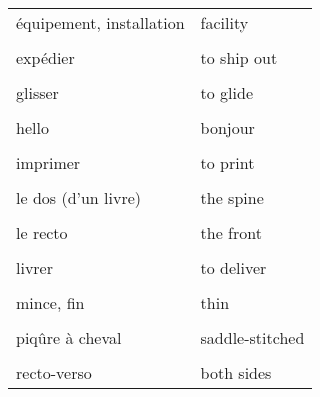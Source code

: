 \documentclass[
  10pt,
]{article}
\begin{document}
\begin{longtable}{ll}
équipement, installation & facility\\

\cellcolor{gray!6}{étape} & \cellcolor{gray!6}{a stage}\\

expédier & to ship out\\

\cellcolor{gray!6}{fonctionner} & \cellcolor{gray!6}{to work}\\

glisser & to glide\\

\cellcolor{gray!6}{gravé au laser} & \cellcolor{gray!6}{laser-etched}\\

hello & bonjour\\

\cellcolor{gray!6}{humecter, humidifier} & \cellcolor{gray!6}{to dampen}\\

imprimer & to print\\

\cellcolor{gray!6}{item fonctionner} & \cellcolor{gray!6}{to work}\\

le dos (d'un livre) & the spine\\

\cellcolor{gray!6}{le grammage} & \cellcolor{gray!6}{paper weight}\\

le recto & the front\\

\cellcolor{gray!6}{le verso} & \cellcolor{gray!6}{the back}\\

livrer & to deliver\\

\cellcolor{gray!6}{mieux convenir à} & \cellcolor{gray!6}{to be best suited for}\\

mince, fin & thin\\

\cellcolor{gray!6}{pailleté, miroitant} & \cellcolor{gray!6}{shimmery}\\

piqûre à cheval & saddle-stitched\\

\cellcolor{gray!6}{précis, aiguisé} & \cellcolor{gray!6}{sharp}\\

recto-verso & both sides\\


\end{longtable}
\end{document}
